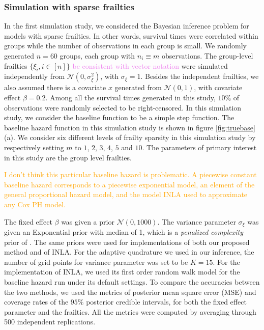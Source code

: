 \documentclass[ba]{imsart}
\newcommand{\alex}[1]{\textcolor{violet}{{ }#1}}
\newcommand{\ziang}[1]{\textcolor{orange}{{ }#1}}
\begin{document}
\subsubsection{Simulation with sparse frailties}\label{subsubsec:sim1}

In the first simulation study, we considered the Bayesian inference problem for models with sparse frailties. In other words, survival times were correlated within groups while the number of observations in each group is small. We randomly generated $n = 60$ groups, each group with $n_i \equiv m$ observations. The group-level frailties $\{\xi_i, i\in [n] \}$\alex{be consistent with vector notation} were simulated independently from $\mathcal{N}(0,\sigma_\xi^{2})$, with $\sigma_{\xi} = 1$. Besides the independent frailties, we also assumed there is a covariate $x$ generated from $\mathcal{N}(0,1)$, with covariate effect $\beta = 0.2$. Among all the survival times generated in this study, $10\%$ of observations were randomly selected to be right-censored. In this simulation study, we consider the baseline function to be a simple step function. The baseline hazard function in this simulation study is shown in figure \ref{fig:truebase}(a). We consider six different levels of frailty sparsity in this simulation study by respectively setting $m$ to $1$, $2$, $3$, $4$, $5$ and $10$. The parameters of primary interest in this study are the group level frailties.

\ziang{I don't think this particular baseline hazard is problematic. A piecewise constant baseline hazard corresponds to a piecewise exponential model, an element of the general proportional hazard model, and the model INLA used to approximate any Cox PH model.}

The fixed effect $\beta$ was given a prior $\mathcal{N}(0,1000)$. The variance parameter $\sigma_\xi$ was given an Exponential prior with median of 1, which is a \emph{penalized complexity} prior of \cite{pcprior}. The same priors were used for implementations of both our proposed method and of INLA. For the adaptive quadrature we used in our inference, the number of grid points for variance parameter was set to be $K = 15$. For the implementation of INLA, we used its first order random walk model for the baseline hazard run under its default settings. To compare the accuracies between the two methods, we used the metrics of posterior mean square error (MSE) and coverage rates of the $95\%$ posterior credible intervals, for both the fixed effect parameter and the frailties. All the metrics were computed by averaging through 500 independent replications.
\end{document}
